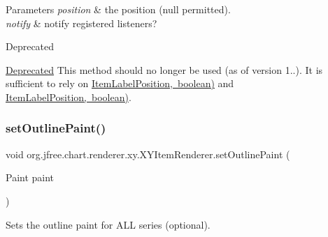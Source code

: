 \begin{DoxyParams}{Parameters}
{\em position} & the position ({\ttfamily null} permitted). \\
\hline
{\em notify} & notify registered listeners?\\
\hline
\end{DoxyParams}
\begin{DoxyRefDesc}{Deprecated}
\item[\mbox{\hyperlink{deprecated__deprecated000238}{Deprecated}}]This method should no longer be used (as of version 1..). It is sufficient to rely on \mbox{\hyperlink{}{Item\+Label\+Position, boolean)}} and \mbox{\hyperlink{}{Item\+Label\+Position, boolean)}}. \end{DoxyRefDesc}
\mbox{\label{interfaceorg_1_1jfree_1_1chart_1_1renderer_1_1xy_1_1_x_y_item_renderer_afc0e80460d35d83afc906fede1089eeb}} 
\subsubsection{\texorpdfstring{set\+Outline\+Paint()}{setOutlinePaint()}}
{\footnotesize\ttfamily void org.\+jfree.\+chart.\+renderer.\+xy.\+X\+Y\+Item\+Renderer.\+set\+Outline\+Paint (\begin{DoxyParamCaption}\item[{Paint}]{paint }\end{DoxyParamCaption})}

Sets the outline paint for A\+LL series (optional).


